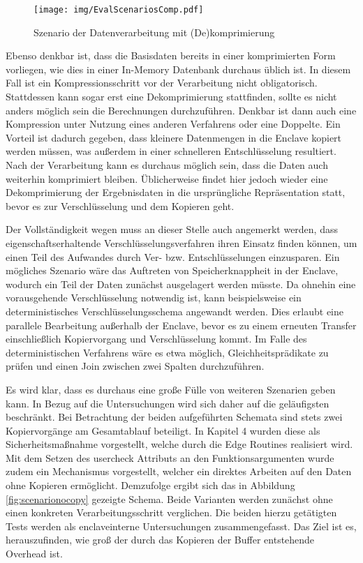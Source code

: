 \begin{figure}[h]
	\texttt{[image: img/EvalScenariosComp.pdf]}
	\centering
	\caption{Szenario der Datenverarbeitung mit (De)komprimierung}
	\label{fig:scenariocomp}
\end{figure}

Ebenso denkbar ist, dass die Basisdaten bereits in einer komprimierten Form vorliegen, wie dies in einer In-Memory Datenbank durchaus üblich ist. In diesem Fall ist ein Kompressionsschritt vor der Verarbeitung nicht obligatorisch. Stattdessen kann sogar erst eine Dekomprimierung stattfinden, sollte es nicht anders möglich sein die Berechnungen durchzuführen. Denkbar ist dann auch eine Kompression unter Nutzung eines anderen Verfahrens oder eine Doppelte. Ein Vorteil ist dadurch gegeben, dass kleinere Datenmengen in die Enclave kopiert werden müssen, was außerdem in einer schnelleren Entschlüsselung resultiert. Nach der Verarbeitung kann es durchaus möglich sein, dass die Daten auch weiterhin komprimiert bleiben. Üblicherweise findet hier jedoch wieder eine Dekomprimierung der Ergebnisdaten in die ursprüngliche Repräsentation statt, bevor es zur Verschlüsselung und dem Kopieren geht.

Der Vollständigkeit wegen muss an dieser Stelle auch angemerkt werden, dass eigenschaftserhaltende Verschlüsselungsverfahren ihren Einsatz finden können, um einen Teil des Aufwandes durch Ver- bzw. Entschlüsselungen einzusparen. Ein mögliches Szenario wäre das Auftreten von Speicherknappheit in der Enclave, wodurch ein Teil der Daten zunächst ausgelagert werden müsste. Da ohnehin eine vorausgehende Verschlüsselung notwendig ist, kann beispielsweise ein deterministisches Verschlüsselungsschema angewandt werden. Dies erlaubt eine parallele Bearbeitung außerhalb der Enclave, bevor es zu einem erneuten Transfer einschließlich Kopiervorgang und Verschlüsselung kommt. Im Falle des deterministischen Verfahrens wäre es etwa möglich, Gleichheitsprädikate zu prüfen und einen Join zwischen zwei Spalten durchzuführen. 

Es wird klar, dass es durchaus eine große Fülle von weiteren Szenarien geben kann. In Bezug auf die Untersuchungen wird sich daher auf die geläufigsten beschränkt. Bei Betrachtung der beiden aufgeführten Schemata sind stets zwei Kopiervorgänge am Gesamtablauf beteiligt. In Kapitel 4 wurden diese als Sicherheitsmaßnahme vorgestellt, welche durch die Edge Routines realisiert wird. Mit dem Setzen des user\textunderscore check Attributs an den Funktionsargumenten wurde zudem ein Mechanismus vorgestellt, welcher ein direktes Arbeiten auf den Daten ohne Kopieren ermöglicht. Demzufolge ergibt sich das in Abbildung \ref{fig:scenarionocopy} gezeigte Schema. Beide Varianten werden zunächst ohne einen konkreten Verarbeitungsschritt verglichen. Die beiden hierzu getätigten Tests werden als enclaveinterne Untersuchungen zusammengefasst. Das Ziel ist es, herauszufinden, wie groß der durch das Kopieren der Buffer entstehende Overhead ist.

